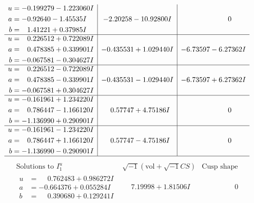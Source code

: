 \documentclass[1p]{elsarticle_modified}
\theoremstyle{definition}
\newcommand{\I}{\sqrt{-1}}
\begin{document}
$$\begin{array}{c|c|c}
\begin{aligned}
u &= -0.199279 - 1.223060 I \\
a &= -0.92640 - 1.45535 I \\
b &= \phantom{-}1.41221 + 0.37985 I\end{aligned}
 & -2.20258 - 10.92800 I & \phantom{-0.000000 } 0 \\ \hline\begin{aligned}
u &= \phantom{-}0.226512 + 0.722089 I \\
a &= \phantom{-}0.478385 + 0.339901 I \\
b &= -0.067581 - 0.304627 I\end{aligned}
 & -0.435531 + 1.029440 I & -6.73597 - 6.27362 I \\ \hline\begin{aligned}
u &= \phantom{-}0.226512 - 0.722089 I \\
a &= \phantom{-}0.478385 - 0.339901 I \\
b &= -0.067581 + 0.304627 I\end{aligned}
 & -0.435531 - 1.029440 I & -6.73597 + 6.27362 I \\ \hline\begin{aligned}
u &= -0.161961 + 1.234220 I \\
a &= \phantom{-}0.786447 - 1.166120 I \\
b &= -1.136990 + 0.290901 I\end{aligned}
 & \phantom{-}0.57747 + 4.75186 I & \phantom{-0.000000 } 0 \\ \hline\begin{aligned}
u &= -0.161961 - 1.234220 I \\
a &= \phantom{-}0.786447 + 1.166120 I \\
b &= -1.136990 - 0.290901 I\end{aligned}
 & \phantom{-}0.57747 - 4.75186 I & \phantom{-0.000000 } 0\\
 \hline 
 \end{array}$$\newpage$$\begin{array}{c|c|c}  
\text{Solutions to }I^u_{1}& \I (\text{vol} + \sqrt{-1}CS) & \text{Cusp shape}\\
 \hline 
\begin{aligned}
u &= \phantom{-}0.762483 + 0.986272 I \\
a &= -0.664376 + 0.055284 I \\
b &= \phantom{-}0.390680 + 0.129241 I\end{aligned}
 & \phantom{-}7.19998 + 1.81506 I & \phantom{-0.000000 } 0 \\ \hline\begin{aligned}

\end{aligned}
\end{array}$$
\end{document}
